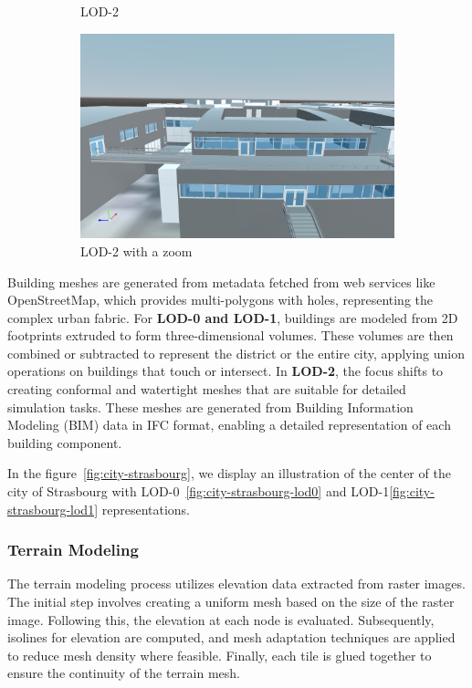 \documentclass[runningheads]{llncs}
\begin{document}
\begin{figure}[htbp]
\begin{subfigure}{.4\textwidth}
  \caption{LOD-2}
  \label{fig:sub3}
\end{subfigure}%
\begin{subfigure}{.4\textwidth}
  \centering
  \includegraphics[width=\linewidth]{images/buildings-lod2-zoom.png}
  \caption{LOD-2 with a zoom}
  \label{fig:sub4}
\end{subfigure}
\caption{}
\label{fig:buildings}
\end{figure}


Building meshes are generated from metadata fetched from web services like OpenStreetMap, which provides multi-polygons with holes, representing the complex urban fabric. For \textbf{LOD-0 and LOD-1}, buildings are modeled from 2D footprints extruded to form three-dimensional volumes. These volumes are then combined or subtracted to represent the district or the entire city, applying union operations on buildings that touch or intersect. In \textbf{LOD-2}, the focus shifts to creating conformal and watertight meshes that are suitable for detailed simulation tasks. These meshes are generated from Building Information Modeling (BIM) data in IFC format, enabling a detailed representation of each building component.

In the figure~\ref{fig:city-strasbourg}, we display an illustration of the center of the city of Strasbourg with LOD-0~\ref{fig:city-strasbourg-lod0} and LOD-1\ref{fig:city-strasbourg-lod1} representations.

\subsubsection{Terrain Modeling}
The terrain modeling process utilizes elevation data extracted from raster images. The initial step involves creating a uniform mesh based on the size of the raster image. Following this, the elevation at each node is evaluated. Subsequently, isolines for elevation are computed, and mesh adaptation techniques are applied to reduce mesh density where feasible. Finally, each tile is glued together to ensure the continuity of the terrain mesh.
\end{document}
